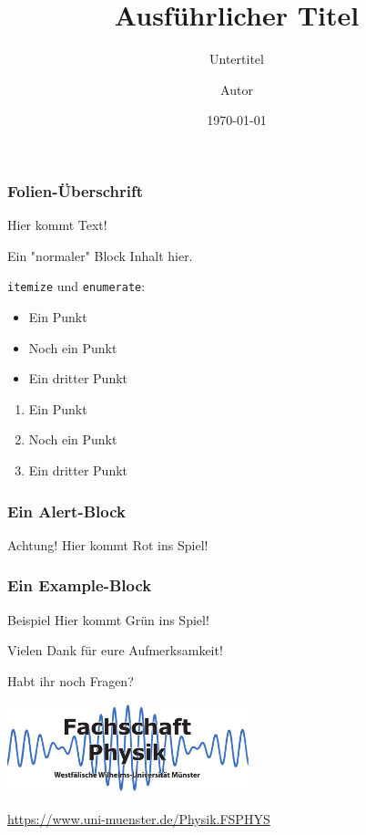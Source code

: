 \documentclass[german, ngerman]{beamer}
\title[Kurzer Titel]{Ausführlicher Titel}
\subtitle{Untertitel}
\author{Autor}
\institute{Fachschaft Physik}
\date{\today}
\begin{document}
\begin{frame}[plain]
	\titlepage
\end{frame}

\begin{frame}
	\frametitle{Folien-Überschrift}

	Hier kommt Text!

	\begin{block}{Ein "normaler" Block}
		Inhalt hier.
	\end{block}

	\texttt{itemize} und \texttt{enumerate}:
	\begin{itemize}
		\item Ein Punkt
		\item Noch ein Punkt
		\item Ein dritter Punkt
	\end{itemize}
	\begin{enumerate}
		\item Ein Punkt
		\item Noch ein Punkt
		\item Ein dritter Punkt
	\end{enumerate}
\end{frame}

\begin{frame}
	\frametitle{Ein Alert-Block}

	\begin{alertblock}{Achtung!}
		Hier kommt Rot ins Spiel!
	\end{alertblock}
\end{frame}

\begin{frame}
	\frametitle{Ein Example-Block}

	\begin{exampleblock}{Beispiel}
		Hier kommt Grün ins Spiel!
	\end{exampleblock}
\end{frame}

\begin{frame}
	\begin{block}{}
		\centering
		Vielen Dank für eure Aufmerksamkeit!
	\end{block}

	\begin{block}{}
		\centering
		Habt ihr noch Fragen?
	\end{block}

	\begin{center}
		\includegraphics[width=7cm]{fsphys-logo.pdf}

		\medskip
		\url{https://www.uni-muenster.de/Physik.FSPHYS}
	\end{center}
\end{frame}
\end{document}
